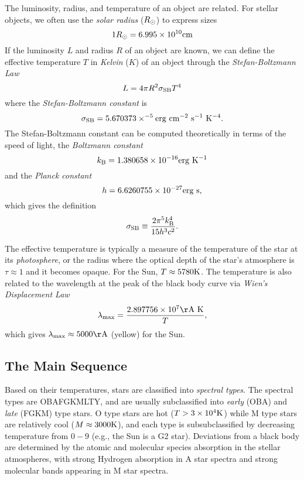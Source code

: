 \documentclass[12pt]{article}
\begin{document}
The luminosity, radius, and temperature of an object are related. For stellar
objects, we often use the {\it solar radius} ($R_{\odot}$) to express sizes
\begin{equation}
1R_{\odot} = 6.995 \times 10^{10} \mathrm{cm}
\end{equation}
\noindent
If the luminosity $L$ and radius $R$ of an object are known, we can define
the effective temperature $T$ in {\it Kelvin} ($K$)
of an object through the {\it Stefan-Boltzmann Law}
\begin{equation}
L = 4\pi R^{2}\sigma_{\mathrm{SB}} T^{4}
\end{equation}
\noindent
where the {\it Stefan-Boltzmann constant} is
\begin{equation}
\sigma_{\mathrm{SB}} = 5.670373\times^{-5} \mathrm{erg}~\mathrm{cm}^{-2}~\mathrm{s}^{-1}~\mathrm{K}^{-4}.
\end{equation}
The Stefan-Boltzmann constant can be computed theoretically in
terms of the speed of light, the {\it Boltzmann constant}
\begin{equation}
k_{\mathrm{B}} = 1.380658\times10^{-16} \mathrm{erg}~\mathrm{K}^{-1}
\end{equation}
\noindent
and the {\it Planck constant}
\begin{equation}
h = 6.6260755\times10^{-27}\mathrm{erg}~\mathrm{s},
\end{equation}
\noindent
which gives the definition
\begin{equation}
\sigma_{\mathrm{SB}} \equiv \frac{2\pi^5 k_{\mathrm{B}}^4}{15 h^3 c^2}.
\end{equation}

The effective temperature is typically a measure of the temperature
of the star at its {\it photosphere}, or the radius where the optical
depth of the star's atmosphere is $\tau\approx1$ and it becomes opaque. 
For the Sun,
$T\approx5780\mathrm{K}$. The temperature is also related to the wavelength
at the peak of the black body curve via {\it Wien's Displacement Law}
\begin{equation}
\lambda_{\mathrm{max}} = \frac{2.897756\times10^{7} \Ang~\K}{T},
\end{equation}
which gives $\lambda_{\mathrm{max}}\approx5000\Ang$ (yellow)
for the Sun.

\subsection{The Main Sequence}

Based on their temperatures, stars are classified into {\it spectral types}.
The spectral types are OBAFGKMLTY, and are usually subclassified into {\it early}
(OBA) and {\it late} (FGKM) type stars. O type stars are hot ($T>3\times10^4\mathrm{K}$) while
M type stars are relatively cool ($M\approx3000\mathrm{K}$), and each type is
subsubclassified by decreasing temperature
from $0-9$ (e.g., the Sun is a G2 star). Deviations from a black body are
determined by the atomic and molecular species absorption in the stellar atmospheres,
with strong Hydrogen absorption in A star spectra and strong molecular bands appearing
in M star spectra.
\end{document}
